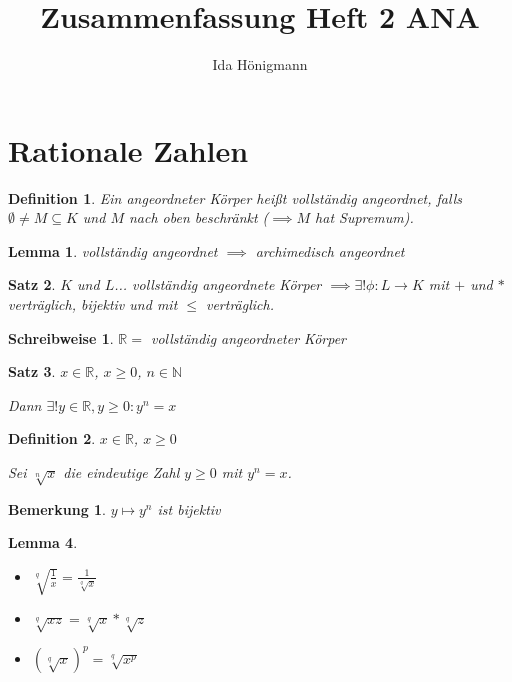 \documentclass[twocolumn]{article}
\title{Zusammenfassung Heft 2 ANA}
\author{Ida Hönigmann}
\newtheorem{theorem}{Satz}[section]
\newtheorem{lemma}[theorem]{Lemma}
\newtheorem{definition}{Definition}[section]
\newtheorem*{remark}{Bemerkung}
\newtheorem*{schreibweise}{Schreibweise}
\begin{document}
	
\maketitle

\section{Rationale Zahlen}
\begin{definition}
	Ein angeordneter Körper heißt vollständig angeordnet, falls $\emptyset \neq M \subseteq K$ und $M$ nach oben beschränkt ($\implies M$ hat Supremum).
\end{definition}

\begin{lemma}
	vollständig angeordnet $\implies$ archimedisch angeordnet
\end{lemma}

\begin{theorem}
	$K$ und $L$... vollständig angeordnete Körper $\implies \exists ! \phi:L\rightarrow K$ mit $+$ und $*$ verträglich, bijektiv und mit $\leq$ verträglich.
\end{theorem}
	
\begin{schreibweise}
	$\mathbb{R}=$ vollständig angeordneter Körper
\end{schreibweise}

\begin{theorem}
	$x\in \mathbb{R}$, $x\geq 0$, $n \in \mathbb{N}$
	
	Dann $\exists ! y \in \mathbb{R}, y \geq 0 : y^{n}=x$
\end{theorem}
	
\begin{definition}
	$x \in \mathbb{R}$, $x \geq 0$
	
	Sei $\sqrt[n]{x}$ die eindeutige Zahl $y \geq 0$ mit $y^{n}=x$.
\end{definition}
	
\begin{remark}
	$y \mapsto y^{n}$ ist bijektiv
\end{remark}
	
\begin{lemma}
	\begin{itemize}
		\item $\sqrt[q]{\frac{1}{x}}=\frac{1}{\sqrt[q]{x}}$
		\item $\sqrt[q]{xz}=\sqrt[q]{x}*\sqrt[q]{z}$
		\item $(\sqrt[q]{x})^{p}=\sqrt[q]{x^{p}}$
	\end{itemize}
\end{lemma}
\end{document}
